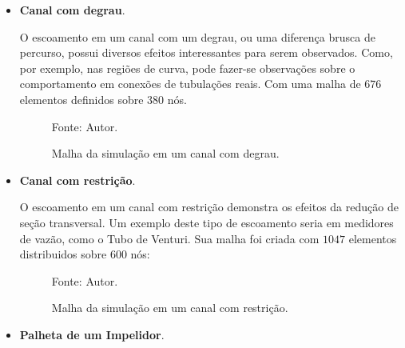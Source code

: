 \begin{itemize}
    \item \textbf{Canal com degrau}.

        O escoamento em um canal com um degrau, ou uma diferença brusca de percurso, possui diversos efeitos interessantes para serem observados.
        Como, por exemplo, nas regiões de curva, pode fazer-se observações sobre o comportamento em conexões de tubulações reais.
        Com uma malha de $676$ elementos definidos sobre $380$ nós.
        \begin{figure}[H]
            \centering
             {\raggedleft \scriptsize Fonte: Autor.}
            \caption{Malha da simulação em um canal com degrau.}
            \label{step_mesh}
        \end{figure}

    \item \textbf{Canal com restrição}.

        O escoamento em um canal com restrição demonstra os efeitos da redução de seção transversal.
        Um exemplo deste tipo de escoamento seria em medidores de vazão, como o Tubo de Venturi. 
        Sua malha foi criada com $1047$ elementos distribuidos sobre $600$ nós:
        \begin{figure}[H]
            \centering
             {\raggedleft \scriptsize Fonte: Autor.}
            \caption{Malha da simulação em um canal com restrição.}
            \label{nozzle_mesh}
        \end{figure}

    \item \textbf{Palheta de um Impelidor}.


\end{itemize}
